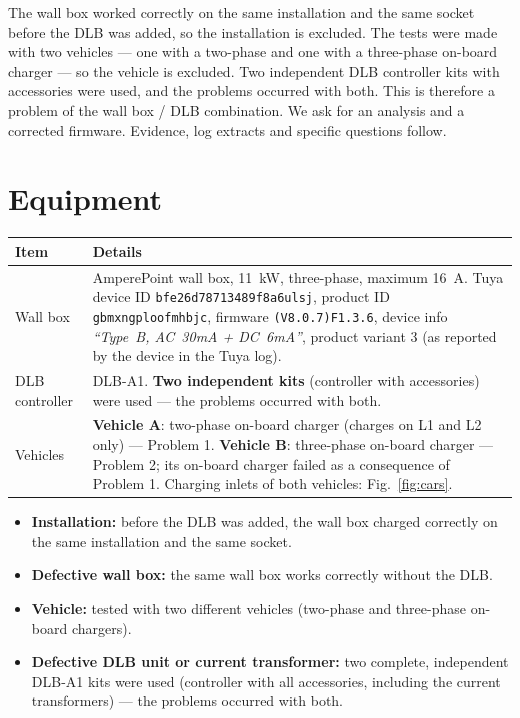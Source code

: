 \documentclass[11pt,a4paper]{article}
\begin{document}
The wall box worked correctly on the same installation and the same socket before the DLB was added, so the installation is excluded. The tests were made with two vehicles — one with a two-phase and one with a three-phase on-board charger — so the vehicle is excluded. Two independent DLB controller kits with accessories were used, and the problems occurred with both. This is therefore a problem of the wall box / DLB combination. We ask for an analysis and a corrected firmware. Evidence, log extracts and specific questions follow.

\section{Equipment}

\begin{longtable}{>{\raggedright\arraybackslash}p{3.2cm}>{\raggedright\arraybackslash}p{12.9cm}}
\toprule
\rowcolor{aphead}\textbf{Item} & \textbf{Details} \\
\midrule\endhead
\bottomrule\endfoot
Wall box & AmperePoint wall box, 11~kW, three-phase, maximum 16~A. Tuya device ID \texttt{bfe26d78713489f8a6ulsj}, product ID \texttt{gbmxngploofmhbjc}, firmware \texttt{(V8.0.7)F1.3.6}, device info \emph{``Type~B, AC~30mA + DC~6mA''}, product variant 3 (as reported by the device in the Tuya log). \\
DLB controller & DLB-A1. \textbf{Two independent kits} (controller with accessories) were used — the problems occurred with both. \\
Vehicles & \textbf{Vehicle A}: two-phase on-board charger (charges on L1 and L2 only) — Problem 1. \textbf{Vehicle B}: three-phase on-board charger — Problem 2; its on-board charger failed as a consequence of Problem 1. Charging inlets of both vehicles: Fig.~\ref{fig:cars}. \\
\end{longtable}

\begin{apbox}
\begin{itemize}
\item \textbf{Installation:} before the DLB was added, the wall box charged correctly on the same installation and the same socket.
\item \textbf{Defective wall box:} the same wall box works correctly without the DLB.
\item \textbf{Vehicle:} tested with two different vehicles (two-phase and three-phase on-board chargers).
\item \textbf{Defective DLB unit or current transformer:} two complete, independent DLB-A1 kits were used (controller with all accessories, including the current transformers) — the problems occurred with both.
\end{itemize}
\end{apbox}
\end{document}
